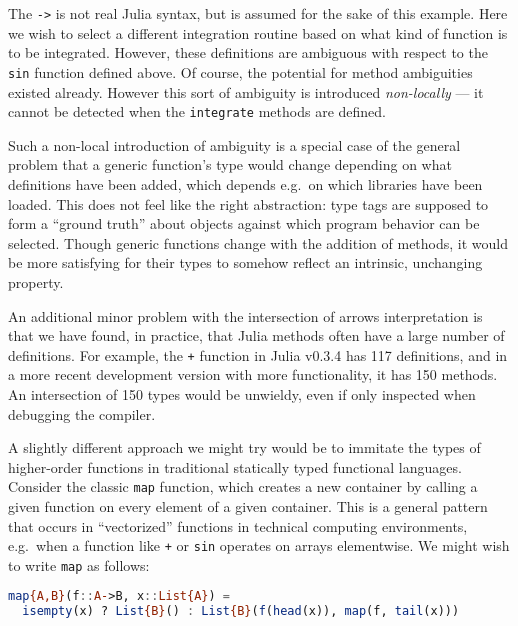 \noindent
The \texttt{->} is not real Julia syntax, but is assumed for the sake of
this example.
Here we wish to select a different integration routine based on what
kind of function is to be integrated.
However, these definitions are ambiguous with respect to the \texttt{sin}
function defined above.
Of course, the potential for method ambiguities existed already.
However this sort of ambiguity is introduced \emph{non-locally} ---
it cannot be detected when the \texttt{integrate} methods are defined.


Such a non-local introduction of ambiguity is a special case of the
general problem that a generic function's type would change depending
on what definitions have been added, which depends e.g.\ on which libraries
have been loaded.
This does not feel like the right abstraction:
type tags are supposed to form a ``ground truth'' about objects against
which program behavior can be selected.
Though generic functions change with the addition of methods, it would be more
satisfying for their types to somehow reflect an intrinsic, unchanging
property.

An additional minor problem with the intersection of arrows
interpretation is that we have found, in practice, that Julia methods
often have a large number of definitions.
For example, the \texttt{+} function in Julia v0.3.4 has 117 definitions,
and in a more recent development version with more functionality, it has
150 methods.
An intersection of 150 types would be unwieldy, even if only
inspected when debugging the compiler.

A slightly different approach we might try would be to immitate
the types of higher-order functions in traditional
statically typed functional languages.
Consider the classic \texttt{map} function, which creates a new container
by calling a given function on every element of a given container.
This is a general pattern that occurs in ``vectorized'' functions in
technical computing environments, e.g.\ when a function like \texttt{+}
or \texttt{sin} operates on arrays elementwise.
We might wish to write \texttt{map} as follows:

\begin{singlespace}
\begin{lstlisting}[language=julia]
map{A,B}(f::A->B, x::List{A}) =
  isempty(x) ? List{B}() : List{B}(f(head(x)), map(f, tail(x)))
\end{lstlisting}
\end{singlespace}

